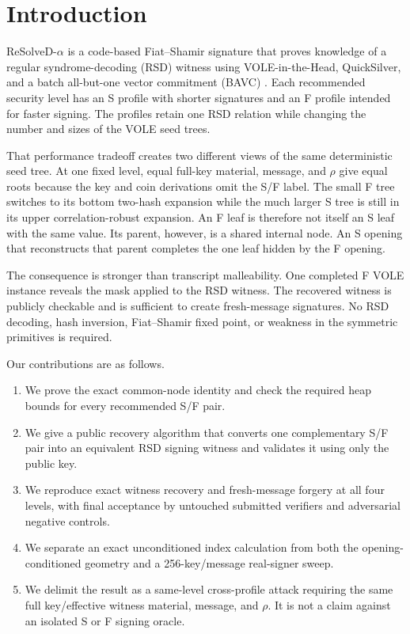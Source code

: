 \documentclass[11pt,a4paper]{article}
\begin{document}
\section{Introduction}

ReSolveD-$\alpha$ is a code-based Fiat--Shamir signature that proves knowledge
of a regular syndrome-decoding (RSD) witness using VOLE-in-the-Head,
QuickSilver, and a batch all-but-one vector commitment (BAVC)
\cite{resolved-spec,resolved-paper}.  Each recommended security level has an S
profile with shorter signatures and an F profile intended for faster signing.
The profiles retain one RSD relation while changing the number and sizes of the
VOLE seed trees.

That performance tradeoff creates two different views of the same deterministic
seed tree.  At one fixed level, equal full-key material, message, and $\rho$
give equal roots because the key and coin derivations omit the S/F label.  The
small F tree switches to its
bottom two-hash expansion while the much larger S tree is still in its upper
correlation-robust expansion.  An F leaf is therefore not itself an S leaf with
the same value.  Its parent, however, is a shared internal node.  An S opening
that reconstructs that parent completes the one leaf hidden by the F opening.

The consequence is stronger than transcript malleability.  One completed F
VOLE instance reveals the mask applied to the RSD witness.  The recovered
witness is publicly checkable and is sufficient to create fresh-message
signatures.  No RSD decoding, hash inversion, Fiat--Shamir fixed point, or
weakness in the symmetric primitives is required.

Our contributions are as follows.
\begin{enumerate}[leftmargin=*,itemsep=2pt]
  \item We prove the exact common-node identity and check the required heap
        bounds for every recommended S/F pair.
  \item We give a public recovery algorithm that converts one complementary
        S/F pair into an equivalent RSD signing witness and validates it using
        only the public key.
  \item We reproduce exact witness recovery and fresh-message forgery at all
        four levels, with final acceptance by untouched submitted verifiers and
        adversarial negative controls.
  \item We separate an exact unconditioned index calculation from both the
        opening-conditioned geometry and a 256-key/message real-signer sweep.
  \item We delimit the result as a same-level cross-profile attack requiring
        the same full key/effective witness material, message, and $\rho$.  It
        is not a claim against an isolated S or F signing oracle.
\end{enumerate}
\end{document}

